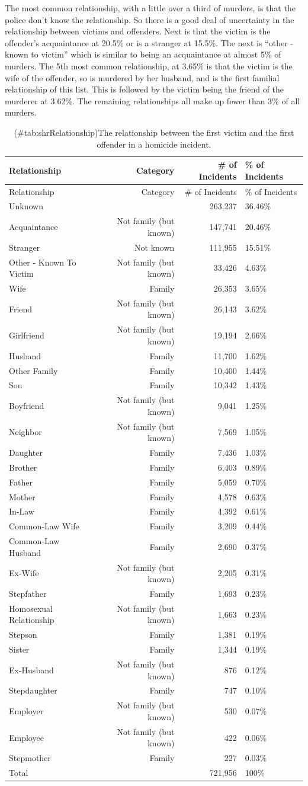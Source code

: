 \documentclass[
  12pt,
  openany]{book}
\begin{document}
The most common relationship, with a little over a third of murders, is that the police don't know the relationship. So there is a good deal of uncertainty in the relationship between victims and offenders. Next is that the victim is the offender's acquaintance at 20.5\% or is a stranger at 15.5\%. The next is ``other - known to victim'' which is similar to being an acquaintance at almost 5\% of murders. The 5th most common relationship, at 3.65\% is that the victim is the wife of the offender, so is murdered by her husband, and is the first familial relationship of this list. This is followed by the victim being the friend of the murderer at 3.62\%. The remaining relationships all make up fewer than 3\% of all murders.

\begin{longtable}[]{@{}lrrl@{}}
\caption{(\#tab:shrRelationship)The relationship between the first victim and the first offender in a homicide incident.}\tabularnewline
\toprule
Relationship & Category & \# of Incidents & \% of Incidents\tabularnewline
\midrule
\endfirsthead
\toprule
Relationship & Category & \# of Incidents & \% of Incidents\tabularnewline
\midrule
\endhead
Unknown & & 263,237 & 36.46\%\tabularnewline
Acquaintance & Not family (but known) & 147,741 & 20.46\%\tabularnewline
Stranger & Not known & 111,955 & 15.51\%\tabularnewline
Other - Known To Victim & Not family (but known) & 33,426 & 4.63\%\tabularnewline
Wife & Family & 26,353 & 3.65\%\tabularnewline
Friend & Not family (but known) & 26,143 & 3.62\%\tabularnewline
Girlfriend & Not family (but known) & 19,194 & 2.66\%\tabularnewline
Husband & Family & 11,700 & 1.62\%\tabularnewline
Other Family & Family & 10,400 & 1.44\%\tabularnewline
Son & Family & 10,342 & 1.43\%\tabularnewline
Boyfriend & Not family (but known) & 9,041 & 1.25\%\tabularnewline
Neighbor & Not family (but known) & 7,569 & 1.05\%\tabularnewline
Daughter & Family & 7,436 & 1.03\%\tabularnewline
Brother & Family & 6,403 & 0.89\%\tabularnewline
Father & Family & 5,059 & 0.70\%\tabularnewline
Mother & Family & 4,578 & 0.63\%\tabularnewline
In-Law & Family & 4,392 & 0.61\%\tabularnewline
Common-Law Wife & Family & 3,209 & 0.44\%\tabularnewline
Common-Law Husband & Family & 2,690 & 0.37\%\tabularnewline
Ex-Wife & Not family (but known) & 2,205 & 0.31\%\tabularnewline
Stepfather & Family & 1,693 & 0.23\%\tabularnewline
Homosexual Relationship & Not family (but known) & 1,663 & 0.23\%\tabularnewline
Stepson & Family & 1,381 & 0.19\%\tabularnewline
Sister & Family & 1,344 & 0.19\%\tabularnewline
Ex-Husband & Not family (but known) & 876 & 0.12\%\tabularnewline
Stepdaughter & Family & 747 & 0.10\%\tabularnewline
Employer & Not family (but known) & 530 & 0.07\%\tabularnewline
Employee & Not family (but known) & 422 & 0.06\%\tabularnewline
Stepmother & Family & 227 & 0.03\%\tabularnewline
Total & & 721,956 & 100\%\tabularnewline
\bottomrule
\end{longtable}
\end{document}
